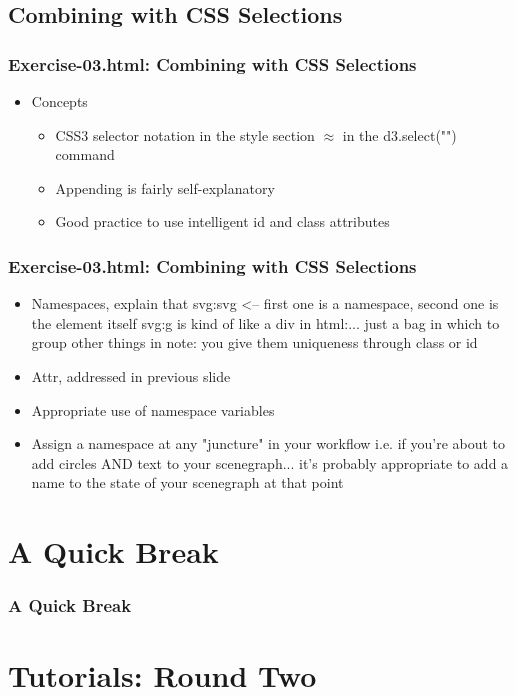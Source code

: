 \documentclass{beamer}
\begin{document}
\subsection{Combining with CSS Selections}

\begin{frame}
    \frametitle{Exercise-03.html: Combining with CSS Selections}
    \begin{itemize}
    \item Concepts
        \begin{itemize}
        \item CSS3 selector notation in the style section $\approx$ in the d3.select("") command
        \item Appending is fairly self-explanatory
        \item Good practice to use intelligent id and class attributes
        \end{itemize}
    \end{itemize}
\end{frame}


\begin{frame}
    \frametitle{Exercise-03.html: Combining with CSS Selections}
    \begin{itemize}
    \item Namespaces, explain that svg:svg <-- first one is a namespace, second one is the element itself svg:g is kind of like a div in html:... just a bag in which to group other things in note: you give them uniqueness through class or id
    \item Attr, addressed in previous slide
    \item Appropriate use of namespace variables
    \item Assign a namespace at any "juncture" in your workflow i.e. if you're about to add circles AND text to your scenegraph... it's probably appropriate to add a name to the state of your scenegraph at that point
    \end{itemize}
\end{frame}


\section{A Quick Break}

\begin{frame}
    \frametitle{A Quick Break}
\end{frame}



\section{Tutorials: Round Two}
\end{document}
